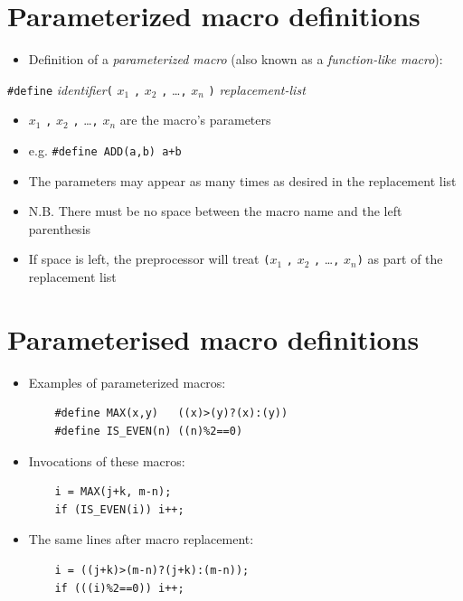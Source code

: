 \documentclass{article}
\begin{document}
\section{Parameterized macro definitions}
\begin{itemize}
\item Definition of a \emph{parameterized macro} (also known as a \emph{function-like macro}):
\end{itemize}
\verb!#define! \emph{identifier}\verb!(! $x_1$ \verb!,! $x_2$ \verb!,! \ldots \verb!,! $x_n$ \verb!)! \emph{replacement-list}
\begin{itemize}
\item $x_1$ \verb!,! $x_2$ \verb!,! \ldots \verb!,! $x_n$ are the macro's parameters
\item e.g. \texttt{#define ADD(a,b) a+b}
\item The parameters may appear as many times as desired in the replacement list
\item N.B. There must be no space between the macro name and the left parenthesis
\item If space is left, the preprocessor will treat \verb!(!$x_1$ \verb!,! $x_2$ \verb!,! \ldots \verb!,! $x_n$\verb!)!  as part of the replacement list
\end{itemize}



\section{Parameterised macro definitions}
\begin{itemize}
\item Examples of parameterized macros:
\begin{verbatim}
	#define MAX(x,y)   ((x)>(y)?(x):(y))
	#define IS_EVEN(n) ((n)%2==0)
\end{verbatim}

\item Invocations of these macros:
\begin{verbatim}
	i = MAX(j+k, m-n);
	if (IS_EVEN(i)) i++;
\end{verbatim}

\item The same lines after macro replacement:
\begin{verbatim}
	i = ((j+k)>(m-n)?(j+k):(m-n));
	if (((i)%2==0)) i++;
\end{verbatim}
\end{itemize}
\end{document}
